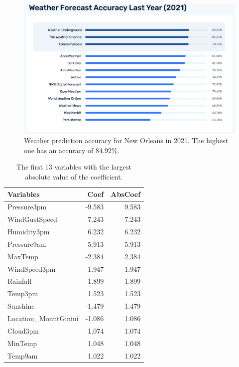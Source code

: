 \documentclass[11pt, a4paper, jou]{apa7}
\begin{document}
\begin{figure}[h]
    \centering
    \caption{Weather prediction accuracy for New Orleans in 2021. The highest one has an accuracy of $84.92\%$. }\label{fig:weather_prediction_nola}
    \includegraphics[width=.55\textwidth]{figures/Weather2021.png}
\end{figure}

\begin{table}[h]
\centering
\caption{The first 13 variables with the largest absolute value of the coefficient. }
\label{tab:rank_coef}
\begin{tabular}{lrr}
\hline
Variables             & Coef   & AbsCoef \\ \hline
Pressure3pm           & -9.583 & 9.583   \\
WindGustSpeed         & 7.243  & 7.243   \\
Humidity3pm           & 6.232  & 6.232   \\
Pressure9am           & 5.913  & 5.913   \\
MaxTemp               & -2.384 & 2.384   \\
WindSpeed3pm          & -1.947 & 1.947   \\
Rainfall              & 1.899  & 1.899   \\
Temp3pm               & 1.523  & 1.523   \\
Sunshine              & -1.479 & 1.479   \\
Location\_MountGinini & -1.086 & 1.086   \\
Cloud3pm              & 1.074  & 1.074   \\
MinTemp               & 1.048  & 1.048   \\
Temp9am               & 1.022  & 1.022   \\ \hline
\end{tabular}
\end{table}
\end{document}
